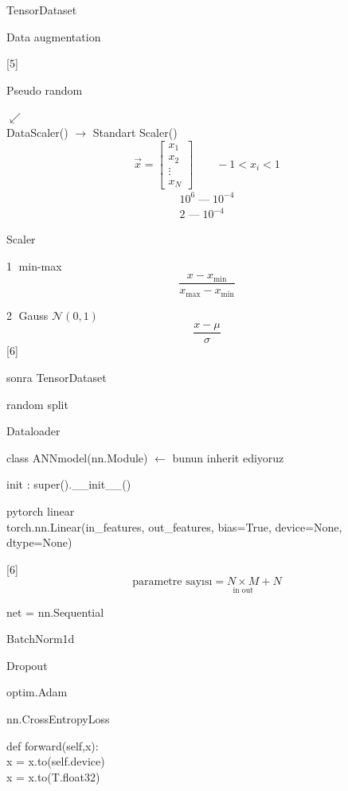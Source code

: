 \documentclass[11pt,a4paper]{article}
\begin{document}
TensorDataset

Data augmentation

[5]

Pseudo random

 $\swarrow$\\
DataScaler() $\rightarrow$ Standart Scaler()
\[ \vec{x} = \begin{bmatrix} x_1 \\ x_2 \\ \vdots \\ x_N \end{bmatrix} \qquad -1 < x_i < 1 \]
\begin{gather*}
10^{6} \;\text{---}\; 10^{-4} \\
2 \;\text{---}\; 10^{-4}
\end{gather*}

Scaler

\textcircled{1} min-max
\[ \frac{x-x_{\min}}{x_{\max}-x_{\min}} \]

\textcircled{2} Gauss $\mathcal{N}(0,1)$
\[ \frac{x-\mu}{\sigma} \]
[6]

sonra TensorDataset

random split

Dataloader

class ANNmodel(nn.Module) \quad $\leftarrow$ bunun inherit ediyoruz

init : super().\_\_init\_\_()

pytorch linear\\
torch.nn.Linear(in\_features, out\_features, bias=True, device=None, dtype=None)

[6]
\[ \text{parametre sayısı} = \underset{\text{in out}}{N\times M} + N \]

net = nn.Sequential

\hspace{2em}BatchNorm1d

\hspace{3em}Dropout

optim.Adam

nn.CrossEntropyLoss

def forward(self,x):\\
\hspace*{2em}x = x.to(self.device)\\
\hspace*{2em}x = x.to(T.float32)
\end{document}
